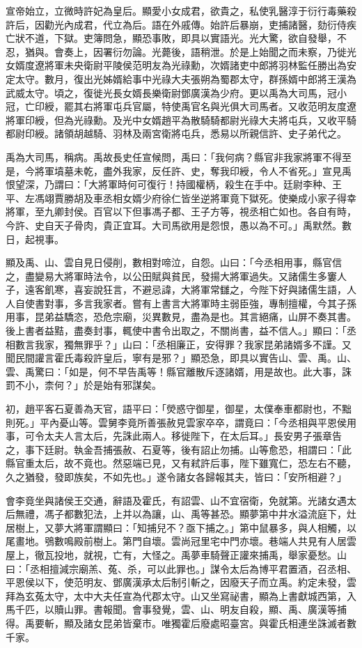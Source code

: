 \begin{pinyinscope}
宣帝始立，立微時許妃為皇后。顯愛小女成君，欲貴之，私使乳醫淳于衍行毒藥殺許后，因勸光內成君，代立為后。語在外戚傳。始許后暴崩，吏捕諸醫，劾衍侍疾亡狀不道，下獄。吏簿問急，顯恐事敗，即具以實語光。光大驚，欲自發舉，不忍，猶與。會奏上，因署衍勿論。光薨後，語稍泄。於是上始聞之而未察，乃徙光女婿度遼將軍未央衛尉平陵侯范明友為光祿勳，次婿諸吏中郎將羽林監任勝出為安定太守。數月，復出光姊婿給事中光祿大夫張朔為蜀郡太守，群孫婿中郎將王漢為武威太守。頃之，復徙光長女婿長樂衛尉鄧廣漢為少府。更以禹為大司馬，冠小冠，亡印綬，罷其右將軍屯兵官屬，特使禹官名與光俱大司馬者。又收范明友度遼將軍印綬，但為光祿勳。及光中女婿趙平為散騎騎都尉光祿大夫將屯兵，又收平騎都尉印綬。諸領胡越騎、羽林及兩宮衛將屯兵，悉易以所親信許、史子弟代之。

禹為大司馬，稱病。禹故長史任宣候問，禹曰：「我何病？縣官非我家將軍不得至是，今將軍墳墓未乾，盡外我家，反任許、史，奪我印綬，令人不省死。」宣見禹恨望深，乃謂曰：「大將軍時何可復行！持國權柄，殺生在手中。廷尉李种、王平、左馮翊賈勝胡及車丞相女婿少府徐仁皆坐逆將軍竟下獄死。使樂成小家子得幸將軍，至九卿封侯。百官以下但事馮子都、王子方等，視丞相亡如也。各自有時，今許、史自天子骨肉，貴正宜耳。大司馬欲用是怨恨，愚以為不可。」禹默然。數日，起視事。

顯及禹、山、雲自見日侵削，數相對啼泣，自怨。山曰：「今丞相用事，縣官信之，盡變易大將軍時法令，以公田賦與貧民，發揚大將軍過失。又諸儒生多窶人子，遠客飢寒，喜妄說狂言，不避忌諱，大將軍常讎之，今陛下好與諸儒生語，人人自使書對事，多言我家者。嘗有上書言大將軍時主弱臣強，專制擅權，今其子孫用事，昆弟益驕恣，恐危宗廟，災異數見，盡為是也。其言絕痛，山屏不奏其書。後上書者益黠，盡奏封事，輒使中書令出取之，不關尚書，益不信人。」顯曰：「丞相數言我家，獨無罪乎？」山曰：「丞相廉正，安得罪？我家昆弟諸婿多不謹。又聞民間讙言霍氏毒殺許皇后，寧有是邪？」顯恐急，即具以實告山、雲、禹。山、雲、禹驚曰：「如是，何不早告禹等！縣官離散斥逐諸婿，用是故也。此大事，誅罰不小，柰何？」於是始有邪謀矣。

初，趙平客石夏善為天官，語平曰：「熒惑守御星，御星，太僕奉車都尉也，不黜則死。」平內憂山等。雲舅李竟所善張赦見雲家卒卒，謂竟曰：「今丞相與平恩侯用事，可令太夫人言太后，先誅此兩人。移徙陛下，在太后耳。」長安男子張章告之，事下廷尉。執金吾捕張赦、石夏等，後有詔止勿捕。山等愈恐，相謂曰：「此縣官重太后，故不竟也。然惡端已見，又有弒許后事，陛下雖寬仁，恐左右不聽，久之猶發，發即族矣，不如先也。」遂令諸女各歸報其夫，皆曰：「安所相避？」

會李竟坐與諸侯王交通，辭語及霍氏，有詔雲、山不宜宿衛，免就第。光諸女遇太后無禮，馮子都數犯法，上并以為讓，山、禹等甚恐。顯夢第中井水溢流庭下，灶居樹上，又夢大將軍謂顯曰：「知捕兒不？亟下捕之。」第中鼠暴多，與人相觸，以尾畫地。鴞數鳴殿前樹上。第門自壞。雲尚冠里宅中門亦壞。巷端人共見有人居雲屋上，徹瓦投地，就視，亡有，大怪之。禹夢車騎聲正讙來捕禹，舉家憂愁。山曰：「丞相擅減宗廟羔、菟、杀，可以此罪也。」謀令太后為博平君置酒，召丞相、平恩侯以下，使范明友、鄧廣漢承太后制引斬之，因廢天子而立禹。約定未發，雲拜為玄菟太守，太中大夫任宣為代郡太守。山又坐寫祕書，顯為上書獻城西第，入馬千匹，以贖山罪。書報聞。會事發覺，雲、山、明友自殺，顯、禹、廣漢等捕得。禹要斬，顯及諸女昆弟皆棄市。唯獨霍后廢處昭臺宮。與霍氏相連坐誅滅者數千家。


\end{pinyinscope}
